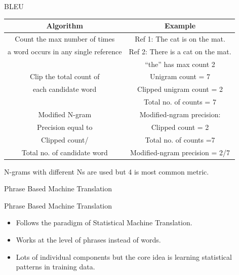﻿\documentclass[table,aspectratio=43,mathserif,xcolor={usenames,dvipsnames,svgnames,table},10pt]{beamer}
\begin{document}
\begin{frame}{BLEU}
 \begin{table}
    \centering
    \begin{tabular}{|c|c|}
        \hline
        \textbf{Algorithm}  & \textbf{Example}  \\ \hline
        Count the max number of times       &       Ref 1: The cat is on the mat.  \\
        a word occurs in any single reference &   Ref 2: There is a cat on the mat. \\
        &“the” has max count 2         \\ %
 \hline
	Clip the total count of & Unigram count = 7 \\
	each candidate word & Clipped unigram count = 2 \\
	&Total no. of counts = 7 \\
\hline
	Modified N-gram & Modified-ngram precision: \\
	Precision equal to & Clipped count = 2 \\
	Clipped count/ & Total no. of counts =7\\
	Total no. of candidate word & Modified-ngram precision = 2/7\\
\hline	
    \end{tabular}
N-grams with different Ns are used but 4 is most common metric.
\end{table}
\end{frame}

\begin{section}{Phrase Based Machine Translation}
\end{section}

\begin{frame}{Phrase Based Machine Translation}
 \begin{itemize}
  \item<+-> Follows the paradigm of Statistical Machine Translation.
  \item<+-> Works at the level of phrases instead of words.
  \item<+-> Lots of individual components but the core idea is learning statistical patterns in training data.
 \end{itemize}
\end{frame}
\end{document}
